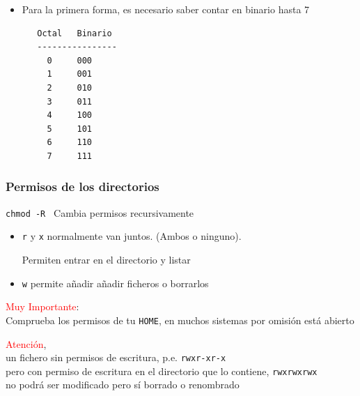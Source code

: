 \documentclass[ucs]{beamer}
\begin{document}
\begin{frame}[fragile]
\begin{itemize}
\item
Para la primera forma, es necesario saber contar en binario
hasta 7
 
\begin{verbatim}
   Octal   Binario
   ----------------
     0     000
     1     001
     2     010
     3     011
     4     100
     5     101
     6     110
     7     111
\end{verbatim}
\end{itemize}

\end{frame}



\begin{frame}[fragile]
\frametitle{Permisos de los directorios}
\verb|chmod -R |   Cambia permisos recursivamente
\begin{itemize} 
\item 
\texttt{r} y  
\texttt{x} normalmente van juntos. (Ambos o ninguno).

Permiten entrar en el directorio y listar
\item \texttt{w} permite añadir añadir ficheros o borrarlos
\end{itemize}

\textcolor{red}{Muy Importante}:\\Comprueba los permisos de tu \verb|HOME|, en muchos sistemas por omisión está abierto

\textcolor{red}{Atención},\\un fichero sin permisos de escritura, p.e. \verb|rwxr-xr-x|\\
pero con permiso de escritura en el directorio que lo contiene, \verb|rwxrwxrwx|\\
no podrá ser modificado pero sí borrado o renombrado

\begin{scriptsize}
\end{scriptsize}
\end{frame}




\end{document}
